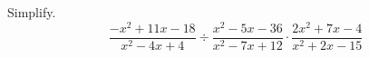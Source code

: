 \begin{exercise}
	Simplify.
\[
	\frac{-x^2+11x-18}{x^2-4x+4}\div \frac{x^2-5x-36}{x^2-7x+12}\cdot \frac{2x^2+7x-4}{x^2+2x-15}
\]
\end{exercise}
\vfill
\begin{center} \hfill
\end{center}
